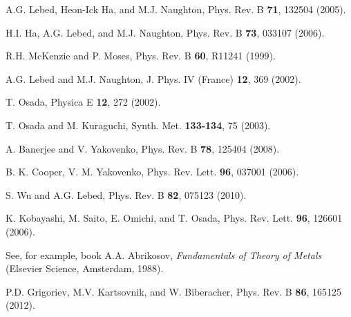 \documentclass[prl,aps,showpacs,twocolumn,floatfix]{revtex4}
\begin{document}
\begin{references}
A.G. Lebed, Heon-Ick Ha, and M.J. Naughton, Phys. Rev. B
\textbf{71}, 132504 (2005).

H.I. Ha, A.G. Lebed, and M.J. Naughton, Phys. Rev. B \textbf{73},
033107 (2006).

R.H. McKenzie and P. Moses, Phys. Rev. B \textbf{60}, R11241
(1999).

A.G. Lebed and M.J. Naughton, J. Phys. IV (France) \textbf{12},
369 (2002).

T. Osada, Physica E \textbf{12}, 272 (2002).

T. Osada and M. Kuraguchi, Synth. Met. \textbf{133-134}, 75
(2003).

A. Banerjee and V. Yakovenko, Phys. Rev. B \textbf{78}, 125404
(2008).

B. K. Cooper, V. M. Yakovenko, Phys. Rev. Lett. \textbf{96},
037001 (2006).


S. Wu and A.G. Lebed, Phys. Rev. B \textbf{82}, 075123 (2010).

K. Kobayashi, M. Saito, E. Omichi, and T. Osada, Phys. Rev. Lett.
\textbf{96}, 126601 (2006).


See, for example, book A.A. Abrikosov, {\it Fundamentals of Theory
of Metals} (Elsevier Science, Amsterdam, 1988).

P.D. Grigoriev, M.V. Kartsovnik, and W. Biberacher, Phys. Rev. B
\textbf{86}, 165125 (2012).










\end{references}
\end{document}
